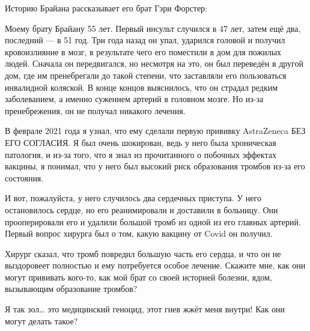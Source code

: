 Историю Брайана рассказывает его брат Гэри Форстер:

Моему брату Брайану 55 лет. Первый инсульт случился в 47 лет, затем ещё два,
последний — в 51 год. Три года назад он упал, ударился головой и получил
кровоизлияние в мозг, в результате чего его поместили в дом для пожилых
людей. Сначала он передвигался, но несмотря на это, он был переведён в другой
дом, где им пренебрегали до такой степени, что заставляли его пользоваться
инвалидной коляской. В конце концов выяснилось, что он страдал редким
заболеванием, а именно сужением артерий в головном мозге. Но из-за
пренебрежения, он не получал никакого лечения.

В феврале 2021 года я узнал, что ему сделали первую прививку AstraZeneca БЕЗ ЕГО
СОГЛАСИЯ. Я был очень шокирован, ведь у него была хроническая патология, и из-за
того, что я знал из прочитанного о побочных эффектах вакцины, я понимал, что у
него был высокий риск образования тромбов из-за его состояния.

И вот, пожалуйста, у него случилось два сердечных приступа. У него остановилось
сердце, но его реанимировали и доставили в больницу. Они прооперировали его и
удалили большой тромб из одной из его главных артерий. Первый вопрос хирурга был
о том, какую вакцину от Covid он получил.

Хирург сказал, что тромб повредил большую часть его сердца, и что он не
выздоровеет полностью и ему потребуется особое лечение. Скажите мне, как они
могут прививать кого-то, как мой брат со своей историей болезни, ядом,
вызывающим образование тромбов?

Я так зол… это медицинский геноцид, этот гнев жжёт меня внутри! Как они могут
делать такое?
